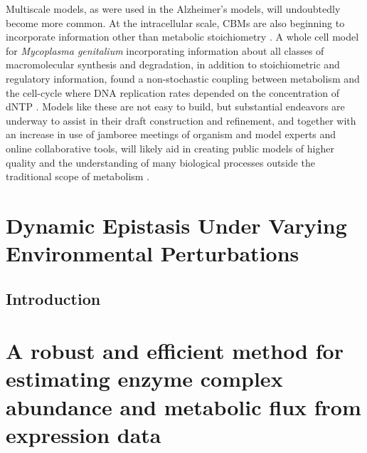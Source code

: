\documentclass[phd,tocprelim]{cornell}
\newcommand*{\commonDir}{../common/}   %
\begin{document}
Multiscale models, as were used in the Alzheimer’s models, will
undoubtedly become more common. At the intracellular scale, CBMs are
also beginning to incorporate information other than metabolic
stoichiometry \citep{Lerman2012, Karr2012, Yizhak2010}. 
A whole cell model for \textit{Mycoplasma genitalium}
incorporating information about all classes of macromolecular
synthesis and degradation, in addition to stoichiometric and
regulatory information, found a non-stochastic coupling between
metabolism and the cell-cycle where DNA replication rates depended on
the concentration of dNTP \citep{Karr2012}. Models like these are not easy to build,
but substantial endeavors are underway to assist in their draft
construction and refinement, and together with an increase in use of
jamboree meetings of organism and model experts and online
collaborative tools, will likely aid in creating public models of
higher quality and the understanding of many biological processes
outside the traditional scope of metabolism \citep{Aziz2012,
Thiele2013, Herrgard2008, Karr2013, kbase2013, Pabinger2011,
Helikar2012}.


%

\chapter{Dynamic Epistasis Under Varying Environmental Perturbations}

\section{Introduction}
\epiSameGeneAbstract



\chapter{A robust and efficient method for
estimating enzyme complex abundance
and metabolic flux from expression data}
\end{document}

